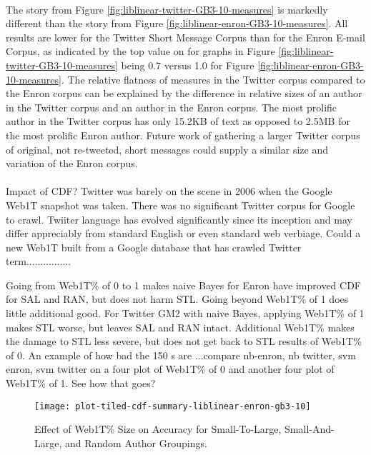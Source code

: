 	\paragraph*{} The story from Figure \ref{fig:liblinear-twitter-GB3-10-measures} is markedly different than the story from Figure \ref{fig:liblinear-enron-GB3-10-measures}.  All results are lower for the Twitter Short Message Corpus than for the Enron E-mail Corpus, as indicated by the top value on for graphs in Figure \ref{fig:liblinear-twitter-GB3-10-measures} being 0.7 versus 1.0 for Figure \ref{fig:liblinear-enron-GB3-10-measures}.  The relative flatness of measures in the Twitter corpus compared to the Enron corpus can be explained by the difference in relative sizes of an author in the Twitter corpus and an author in the Enron corpus.  The most prolific author in the Twitter corpus has only 15.2KB of text as opposed to 2.5MB for the most prolific Enron author.  Future work of gathering a larger Twitter corpus of original, not re-tweeted, short messages could supply a similar size and variation of the Enron corpus.
	
	\paragraph*{} Impact of CDF? Twitter was barely on the scene in 2006 when the Google Web1T snapshot was taken.  There was no significant Twitter corpus for Google to crawl.  Twiiter language has evolved significantly since its inception and may differ appreciably from standard English or even standard web verbiage.  Could a new Web1T built from a Google database that has crawled Twitter term................
	
	Going from Web1T\% of 0 to 1 makes naive Bayes for Enron have improved CDF for SAL and RAN, but does not harm STL.  Going beyond Web1T\% of 1 does little additional good.
	For Twitter GM2 with naive Bayes, applying Web1T\% of 1 makes STL worse, but leaves SAL and RAN intact.  Additional Web1T\% makes the damage to STL less severe, but does not get back to STL results of Web1T\% of 0.
	An example of how bad the 150 s are ...compare nb-enron, nb twitter, svm enron, svm twitter on a four plot of Web1T\% of 0 and another four plot of Web1T\% of 1.  See how that goes?
	
	\begin{figure}[htbp!]
		\begin{center}
		\centering
		\texttt{[image: plot-tiled-cdf-summary-liblinear-enron-gb3-10]}
		\caption{Effect of Web1T\% Size on Accuracy for Small-To-Large, Small-And-Large, and Random Author Groupings.}
		\label{fig:plot-tiled-cdf-summary-liblinear-enron-gb3-10}
		\end{center}
	\end{figure}

